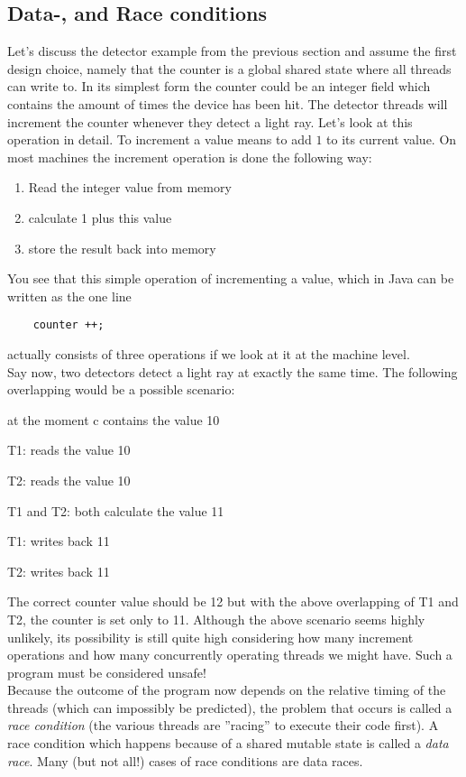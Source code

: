 \documentclass{scrreprt}
\begin{document}
\subsection{Data-, and Race conditions}
Let's discuss the detector example from the previous section and assume the first design choice, namely that the counter is a global shared state where all threads can write to. In its simplest form the counter could be an integer field which contains the amount of times the device has been hit. The detector threads will increment the counter whenever they detect a light ray. Let's look at this operation in detail. To increment a value means to add $1$ to its current value. On most machines the increment operation is done the following way: \\
\begin{enumerate}
\item Read the integer value from memory
\item calculate 1 plus this value
\item store the result back into memory
\end{enumerate}
You see that this simple operation of incrementing a value, which in Java can be written as the one line
\lstset{language=Java}
\begin{lstlisting}
	counter ++;
\end{lstlisting}
actually consists of three operations if we look at it at the machine level. \\
Say now, two detectors detect a light ray at exactly the same time. The following overlapping would be a possible scenario:
\begin{description}
\item at the moment c contains the value 10
\item T1: reads the value 10
\item T2: reads the value 10
\item T1 and T2: both calculate the value 11
\item T1: writes back 11
\item T2: writes back 11
\end{description}
The correct counter value should be 12 but with the above overlapping of T1 and T2, the counter is set only to 11. Although the above scenario seems highly unlikely, its possibility is still quite high considering how many increment operations and how many concurrently operating threads we might have. Such a program must be considered unsafe! \\
Because the outcome of the program now depends on the relative timing of the threads (which can impossibly be predicted), the problem that occurs is called a \textit{race condition} (the various threads are ''racing'' to execute their code first). A race condition which happens because of a shared mutable state is called a \textit{data race}. Many (but not all!) cases of race conditions are data races. \\
\end{document}

